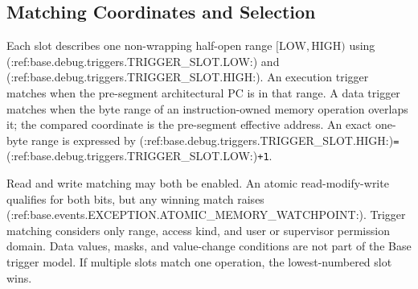 \subsection{Matching Coordinates and Selection}
Each slot describes one non-wrapping half-open range $[\mathrm{LOW},\mathrm{HIGH})$ using (:ref:base.debug.triggers.TRIGGER_SLOT.LOW:) and (:ref:base.debug.triggers.TRIGGER_SLOT.HIGH:). An execution trigger matches when
the pre-segment architectural PC is in that range. A data trigger matches when the byte range of an instruction-owned
memory operation overlaps it; the compared coordinate is the pre-segment effective address. An exact one-byte range
is expressed by (:ref:base.debug.triggers.TRIGGER_SLOT.HIGH:)\texttt{=}(:ref:base.debug.triggers.TRIGGER_SLOT.LOW:)\texttt{+1}.

Read and write matching may both be enabled. An atomic read-modify-write qualifies for both bits, but any winning
match raises (:ref:base.events.EXCEPTION.ATOMIC_MEMORY_WATCHPOINT:). Trigger matching considers only range, access
kind, and user or supervisor permission domain. Data values, masks, and value-change conditions are not part of the
Base trigger model. If multiple slots match one operation, the lowest-numbered slot wins.
